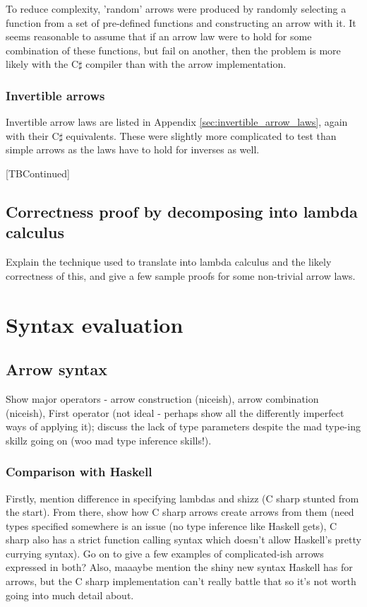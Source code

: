 \documentclass[12pt,twoside,notitlepage]{report}
\begin{document}
To reduce complexity, 'random' arrows were produced by randomly selecting a function from a set of pre-defined functions and constructing an arrow with it. It seems reasonable to assume that if an arrow law were to hold for some combination of these functions, but fail on another, then the problem is more likely with the C$\sharp$ compiler than with the arrow implementation.

\subsubsection{Invertible arrows}

Invertible arrow laws are listed in Appendix \ref{sec:invertible_arrow_laws}, again with their C$\sharp$ equivalents. These were slightly more complicated to test than simple arrows as the laws have to hold for inverses as well.

[TBContinued]

\subsection{Correctness proof by decomposing into lambda calculus}

Explain the technique used to translate into lambda calculus and the likely correctness of this, and give a few sample proofs for some non-trivial arrow laws.

\section{Syntax evaluation}

\subsection{Arrow syntax}

Show major operators - arrow construction (niceish), arrow combination (niceish), First operator (not ideal - perhaps show all the differently imperfect ways of applying it); discuss the lack of type parameters despite the mad type-ing skillz going on (woo mad type inference skills!).

\subsubsection{Comparison with Haskell}

Firstly, mention difference in specifying lambdas and shizz (C sharp stunted from the start). From there, show how C sharp arrows create arrows from them (need types specified somewhere is an issue (no type inference like Haskell gets), C sharp also has a strict function calling syntax which doesn't allow Haskell's pretty currying syntax). Go on to give a few examples of complicated-ish arrows expressed in both? Also, maaaybe mention the shiny new syntax Haskell has for arrows, but the C sharp implementation can't really battle that so it's not worth going into much detail about.
\end{document}
